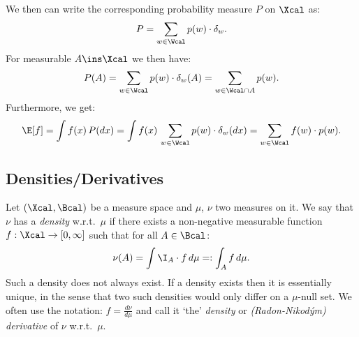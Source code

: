 \begin{Eg}
\begin{enumerate}
            We then can write the corresponding probability measure $P$ on $\Xcal$ as: %
            \[  P = \sum_{w \in \Wcal} p(w) \cdot \delta_{w}.\]
            For measurable $A \ins \Xcal$ we then have:
             \[ P(A) = \sum_{w \in \Wcal} p(w) \cdot \delta_{w}(A) = \sum_{w \in \Wcal \cap A} p(w). \]
            Furthermore, we get:
            \[ \E[f] = \int f(x)\, P(dx) = \int f(x)\,\sum_{w \in \Wcal} p(w) \cdot \delta_{w}(dx) = \sum_{w \in \Wcal} f(w) \cdot p(w). \]
    \end{enumerate}
\end{Eg}






\subsection{Densities/Derivatives}

\begin{Def}
    Let $(\Xcal,\Bcal)$ be a measure space and $\mu$, $\nu$ two measures on it.
    We say that $\nu$ has a \emph{density} w.r.t.\ $\mu$ if there exists a non-negative measurable function $f: \Xcal \to [0,\infty]$ such that for all $A \in \Bcal$:
    \[ \nu(A) = \int \I_A\cdot f \, d\mu =:\int_A f \, d\mu  .\]
    Such a density does not always exist.
    If a density exists then it is essentially unique, in the sense that two such densities would only differ on a $\mu$-null set.
    We often use the notation: $f=\frac{d\nu}{d\mu}$ and call it `the' \emph{density} or \emph{(Radon-Nikod\'ym) derivative} of $\nu$ w.r.t.\ $\mu$.
\end{Def}

